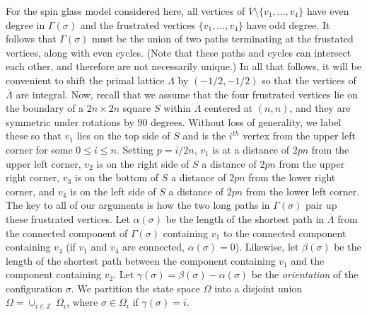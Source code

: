 \documentclass[letterpaper,english,numberwithinsect]{amsart}
\begin{document}
For the spin glass model considered here, all vertices of $\overline{V} \setminus \{v_1,...,v_4\}$  have even degree in $\Gamma(\sigma)$ and  the frustrated vertices $\{v_1,...,v_4\}$  have odd degree.  
 It follows that $\Gamma(\sigma)$ must be the union of two paths terminating at the frustated vertices, along with even cycles.   (Note that these paths and cycles can intersect each other, and therefore are not necessarily unique.)  In all that follows, it will be convenient to shift the primal lattice $\Lambda$ by $(-1/2, -1/2)$ so that the vertices of $\overline{\Lambda}$ are integral.
Now, recall that we assume that the four frustrated vertices lie on the boundary of a $2n \times 2n$ square $S$ within $\overline{\Lambda}$ centered at $(n, n)$, and they are symmetric under rotations by $90$ degrees.  Without loss of generality, we label these so that $v_1$ lies on the top side of $S$ and is the $i^{th}$ vertex from the upper left corner for some $0 \leq i \leq n$. Setting $p = i/2n$, $v_1$ is at a distance of $2pn$ from the upper left corner, $v_2$ is on the right side of $S$ a distance of $2pn$ from the upper right corner, $v_3$ is on the bottom of $S$ a distance of $2pn$ from the lower right corner, and $v_4$ is on the left side of $S$ a distance of $2pn$ from the lower left corner.  The key to all of our arguments is how the two long paths in $\Gamma(\sigma)$ pair up these frustrated vertices.
Let $\alpha(\sigma)$ be the length of the shortest path in $\overline{\Lambda}$ from the connected component of $\Gamma(\sigma)$ containing $v_1$ to the connected component containing $v_4$ (if $v_1$ and $v_4$ are connected, $\alpha(\sigma)=0$).  Likewise, let $\beta(\sigma)$ be the length of the shortest path between the component containing $v_1$ and the component containing $v_2$.  Let $\gamma(\sigma) = \beta(\sigma)-\alpha(\sigma)$ be the {\it orientation} of the configuration $\sigma$.  We  partition the state space $\Omega$ into a disjoint union  $\Omega = \cup_{i \in \mathbb{Z}} \  \Omega_i$, where $\sigma \in \Omega_i$ if $\gamma(\sigma) = i$.  
\end{document}
